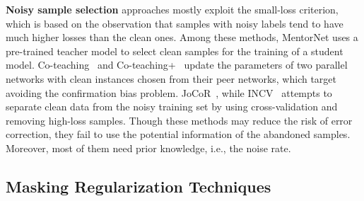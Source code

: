 \documentclass[10pt,twocolumn,letterpaper]{article}
\begin{document}
\textbf{Noisy sample selection} approaches mostly exploit the small-loss criterion, which is based on the observation that samples with noisy labels tend to have much higher losses than the clean ones. Among these methods, MentorNet uses a pre-trained teacher model to select clean samples for the training of a student model. Co-teaching~\cite{han2018co} and Co-teaching+~\cite{yu2019does} update the parameters of two parallel networks with clean instances chosen from their peer networks, which target avoiding the confirmation bias problem. JoCoR~\cite{wei2020combating}, while INCV~\cite{chen2019understanding} attempts to separate clean data from the noisy training set by using cross-validation and removing high-loss samples. Though these methods may reduce the risk of error correction, they fail to use the potential information of the abandoned samples. Moreover, most of them need prior knowledge, i.e., the noise rate.


\subsection{Masking Regularization Techniques}
\end{document}

